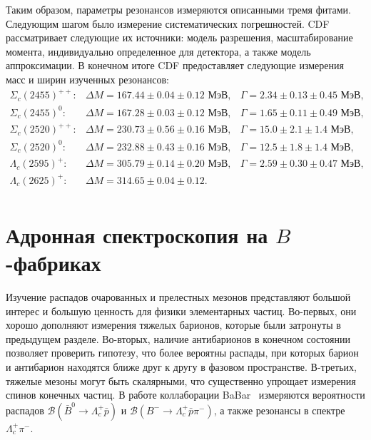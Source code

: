 \documentclass[a4paper, 12pt]{article}
\begin{document}

Таким образом, параметры резонансов измеряются описанными тремя фитами. 
Следующим шагом было измерение систематических погрешностей. CDF 
рассматривает следующие их источники: модель разрешения, масштабирование 
момента, индивидуально определенное для детектора, а также модель 
аппроксимации. В конечном итоге CDF предоставляет следующие измерения 
масс и ширин изученных резонансов:
\[
  \begin{array}{rll}
    \Sigma_c(2455)^{++} : & \Delta M = 167.44 \pm 0.04 \pm 0.12 \text{ МэВ}, & \Gamma = 2.34 \pm 0.13 \pm 0.45 \text{ МэВ}, \\
    \Sigma_c(2455)^{0}  : & \Delta M = 167.28 \pm 0.03 \pm 0.12 \text{ МэВ}, & \Gamma = 1.65 \pm 0.11 \pm 0.49 \text{ МэВ}, \\
    \Sigma_c(2520)^{++} : & \Delta M = 230.73 \pm 0.56 \pm 0.16 \text{ МэВ}, & \Gamma = 15.0 \pm 2.1  \pm 1.4  \text{ МэВ}, \\
    \Sigma_c(2520)^{0}  : & \Delta M = 232.88 \pm 0.43 \pm 0.16 \text{ МэВ}, & \Gamma = 12.5 \pm 1.8  \pm 1.4  \text{ МэВ}, \\
    \Lambda_c(2595)^+   : & \Delta M = 305.79 \pm 0.14 \pm 0.20 \text{ МэВ}, & \Gamma = 2.59 \pm 0.30 \pm 0.47 \text{ МэВ}, \\
    \Lambda_c(2625)^+   : & \Delta M = 314.65 \pm 0.04 \pm 0.12. & \\
  \end{array}
\]


\clearpage
\section{Адронная спектроскопия на $B$-фабриках}


Изучение распадов очарованных и прелестных мезонов представляют большой 
интерес и большую ценность для физики элементарных частиц. Во-первых, 
они хорошо дополняют измерения тяжелых барионов, которые были затронуты 
в предыдущем разделе. Во-вторых, наличие антибарионов в конечном 
состоянии позволяет проверить гипотезу, что более вероятны распады, при 
которых барион и антибарион находятся ближе друг к другу в фазовом 
пространстве. В-третьих, тяжелые мезоны могут быть скалярными, что 
существенно упрощает измерения спинов конечных частиц.
%
В работе коллаборации BaBar~\cite{2-babar-sc} измеряются вероятности 
распадов $\mathcal{B}\left(\bar{B}^0\to\Lambda_c^+\bar{p}\right)$ 
и $\mathcal{B}\left(B^-\to\Lambda_c^+\bar{p}\pi^-\right)$, а также 
резонансы в спектре $\Lambda_c^+\pi^-$.
\end{document}

